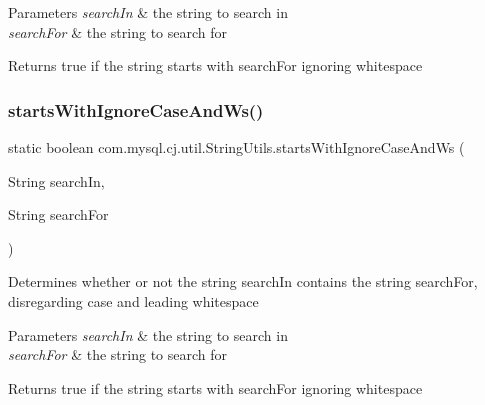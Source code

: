 \begin{DoxyParams}{Parameters}
{\em search\+In} & the string to search in \\
\hline
{\em search\+For} & the string to search for\\
\hline
\end{DoxyParams}
\begin{DoxyReturn}{Returns}
true if the string starts with \textquotesingle{}search\+For\textquotesingle{} ignoring whitespace 
\end{DoxyReturn}
\mbox{\label{classcom_1_1mysql_1_1cj_1_1util_1_1_string_utils_a2298af2ffee1efab8d573b5c22402008}} 
\subsubsection{\texorpdfstring{starts\+With\+Ignore\+Case\+And\+Ws()}{startsWithIgnoreCaseAndWs()}\hspace{0.1cm}{\footnotesize\ttfamily [1/3]}}
{\footnotesize\ttfamily static boolean com.\+mysql.\+cj.\+util.\+String\+Utils.\+starts\+With\+Ignore\+Case\+And\+Ws (\begin{DoxyParamCaption}\item[{String}]{search\+In,  }\item[{String}]{search\+For }\end{DoxyParamCaption})\hspace{0.3cm}{\ttfamily [static]}}

Determines whether or not the string \textquotesingle{}search\+In\textquotesingle{} contains the string \textquotesingle{}search\+For\textquotesingle{}, disregarding case and leading whitespace


\begin{DoxyParams}{Parameters}
{\em search\+In} & the string to search in \\
\hline
{\em search\+For} & the string to search for\\
\hline
\end{DoxyParams}
\begin{DoxyReturn}{Returns}
true if the string starts with \textquotesingle{}search\+For\textquotesingle{} ignoring whitespace 
\end{DoxyReturn}
\mbox{\label{classcom_1_1mysql_1_1cj_1_1util_1_1_string_utils_a9e333e061facfdfad33dd7d86aba5c58}} 
